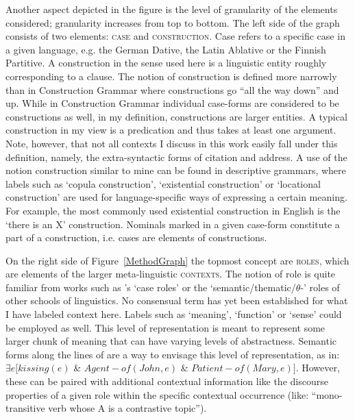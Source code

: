Another aspect depicted in the figure is the level of granularity of the elements considered; granularity increases from top to bottom. 
The left side of the graph consists of two elements: \textsc{case} and \textsc{construction}. 
Case refers to a specific case in a given language, e.g. the German Dative, the Latin Ablative or the Finnish Partitive. 
A construction in the sense used here is a linguistic entity roughly corresponding to a clause. 
The notion of construction is defined more narrowly than in Construction Grammar \citep[18]{Goldberg:2006} where constructions go ``all the way down'' and up. 
While in Construction Grammar individual case-forms are considered to be constructions as well, in my definition, constructions are larger entities. 
A typical construction in my view is a predication and thus takes at least one argument. 
Note, however, that not all contexts I discuss in this work easily fall under this definition, namely, the extra-syntactic forms of citation and address.
A use of the notion construction similar to mine can be found in descriptive grammars, where labels such as `{copula construction}', `{existential construction}' or `{locational construction}' are used for language-specific ways of expressing a certain meaning.
For example, the most commonly used existential construction in English is the `there is an X' construction.
Nominals marked in a given case-form constitute a part of a construction, i.e. cases are elements of constructions. 

On the right side of Figure~\ref{MethodGraph} the topmost concept are \textsc{roles}, which are elements of the larger meta-linguistic \textsc{contexts}. 
The notion of role is quite familiar from works such as \citeauthor{Fillmore:1969}'s \citeyear{Fillmore:1969} `case roles' or the `se\-man\-tic/\-the\-ma\-tic/\-$\theta$-' roles of other schools of linguistics. 
No consensual term has yet been established for what I have labeled context here. %
Labels such as `meaning', `function' or `sense' could be employed as well.
This level of representation is meant to represent some larger chunk of meaning that can have varying levels of abstractness. 
Semantic forms along the lines of \citet{Dowty:1991} are a way to envisage this level of representation, as in: $\exists e [kissing(e)$ \& $Agent-of(John,e)$ \& $Patient-of(Mary,e)]$. 
However, these can be paired with additional contextual information like the discourse properties of a given role within the specific contextual occurrence (like: ``mono-transitive verb whose A  is a contrastive topic'').      

